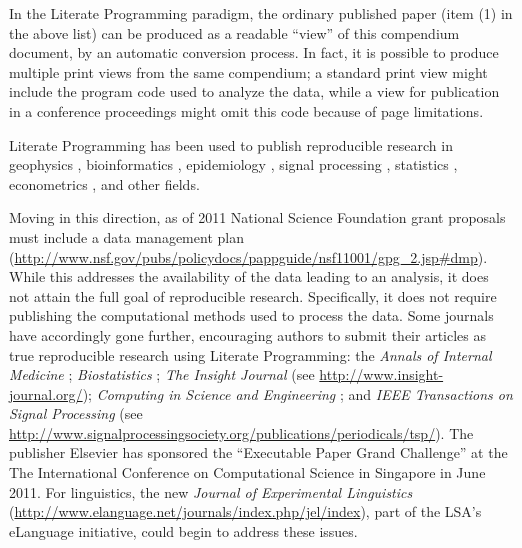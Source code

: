 In the Literate Programming paradigm, the ordinary published paper (item (1) in the above list) can be produced as a readable ``view'' of this compendium document, by an automatic conversion process.  In fact, it is possible to produce multiple print views from the same compendium; a standard print view might include the program code used to analyze the data, while a view for publication in a conference proceedings might omit this code because of page limitations.

Literate Programming has been used to publish reproducible research in geophysics \citep{ClaerboutEtAl1992}, bioinformatics \citep{GentlemanEtAl2004,Hothorn2011}, epidemiology \citep{PengEtAl2006}, signal processing \citep{BuckheitEtAl1995,VandewalleEtAl2009}, statistics \citep{Leisch2002,DonohoEtAl2009,LenthEtAl2011}, econometrics \citep{KoenkerEtAl2009}, and other fields.

Moving in this direction, as of 2011 National Science Foundation grant proposals must include a data management plan (\url{http://www.nsf.gov/pubs/policydocs/pappguide/nsf11001/gpg\_2.jsp\#dmp}). While this addresses the availability of the data leading to an analysis, it does not attain the full goal of reproducible research. Specifically, it does not require publishing the computational methods used to process the data. Some journals have accordingly gone further, encouraging authors to submit their articles as true reproducible research using Literate Programming: 
the {\textit{Annals of Internal Medicine}} \citep{LaineEtAl2007};
{\textit{Biostatistics}} \citep{Peng2009};
{\textit{The Insight Journal}} (see \url{http://www.insight-journal.org/});
{\textit{Computing in Science and Engineering}} \citep{FomelEtAl2009}; and 
{\textit{IEEE Transactions on Signal Processing}} (see \url{http://www.signalprocessingsociety.org/publications/periodicals/tsp/}).
The publisher Elsevier has sponsored the ``Executable Paper Grand Challenge'' at the The International Conference on Computational Science in Singapore in June 2011. For linguistics, the new {\textit{Journal of Experimental Linguistics}} (\url{http://www.elanguage.net/journals/index.php/jel/index}), part of the LSA's eLanguage initiative, could begin to address these issues.

